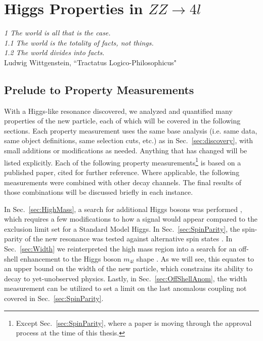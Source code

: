 \chapter{Higgs Properties in $ZZ\rightarrow4l$}
\label{sec:properties}

\begin{center}
\begin{footnotesize}
\textit{1 The world is all that is the case. \\
1.1 The world is the totality of facts, not things.\\
1.2 The world divides into facts.}\\
Ludwig Wittgenstein, ``Tractatus Logico-Philosophicus"
\end{footnotesize}
\end{center}

\section{Prelude to Property Measurements}
\label{sec:Prelude}

With a Higgs-like resonance discovered, we analyzed and quantified many properties of the new particle, each of which will be covered in the following sections. Each property measurement uses the same base analysis (i.e. same data, same object definitions, same selection cuts, etc.) as in Sec.~\ref{sec:discovery}, with small additions or modifications as needed. Anything that has changed will be listed explicitly. Each of the following property measurements\footnote{Except Sec.~\ref{sec:SpinParity}, where a paper is moving through the approval process at the time of this thesis.} is based on a published paper, cited for further reference. Where applicable, the following measurements were combined with other decay channels. The final results of those combinations will be discussed briefly in each instance.

In Sec.~\ref{sec:HighMass}, a search for additional Higgs bosons was performed \cite{}, which requires a few modifications to how a signal would appear compared to the exclusion limit set for a Standard Model Higgs. In Sec.~\ref{sec:SpinParity}, the spin-parity of the new resonance was tested against alternative spin states \cite{}. In Sec.~\ref{sec:Width} we reinterpreted the high mass region into a search for an off-shell enhancement to the Higgs boson $m_{4l}$ shape \cite{}. As we will see, this equates to an upper bound on the width of the new particle, which constrains its ability to decay to yet-unobserved physics. Lastly, in Sec.~\ref{sec:OffShellAnom}, the width measurement can be utilized to set a limit on the last anomalous coupling not covered in Sec.~\ref{sec:SpinParity}.

